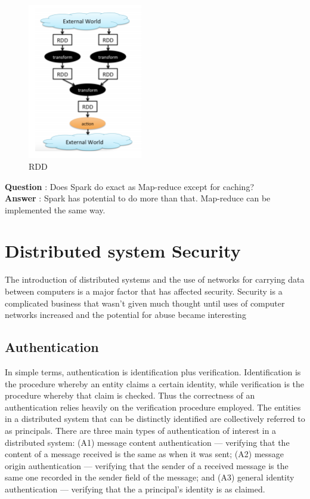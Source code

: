 \documentclass[twoside]{article}
\begin{document}
\begin{figure}[H]
\centering
\includegraphics[width=50mm]{RDD.png}
\caption{RDD \label{overflow}}
\end{figure}

\textbf{Question} : Does Spark do exact as Map-reduce except for caching? \\
\textbf{Answer} : Spark has potential to do more than that. Map-reduce can be implemented the same way.

\section{Distributed system Security}
The introduction of distributed systems and the use of networks for carrying data between computers is a major factor that has affected security. Security is a complicated business that wasn't given much thought until uses of computer networks increased and the potential for abuse became interesting 
\subsection{Authentication}
In simple terms, authentication is identification plus verification. Identification is the procedure whereby an entity claims a certain identity, while verification is the procedure whereby that claim is checked. Thus the correctness of an authentication relies heavily on the verification procedure employed.
The entities in a distributed system that can be distinctly identified are collectively referred to as principals.
There are three main types of authentication of interest in a distributed system:
(A1) message content authentication — verifying that the content of a message received is the same as
when it was sent;
(A2) message origin authentication — verifying that the sender of a received message is the same one
recorded in the sender field of the message; and
(A3) general identity authentication — verifying that the a principal’s identity is as claimed.
\end{document}
